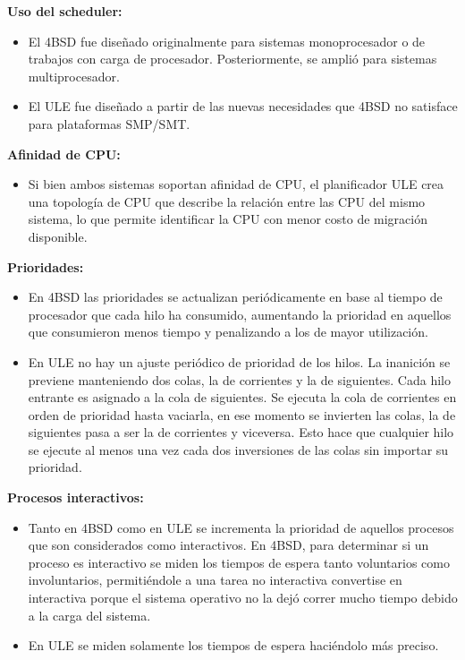 \documentclass[a4paper]{book}
\begin{document}
\textbf{Uso del scheduler:}

\begin{itemize}
\item El 4BSD fue diseñado originalmente para sistemas monoprocesador o de trabajos con carga de procesador. Posteriormente, se amplió para sistemas multiprocesador.
\item El ULE fue diseñado a partir de las nuevas necesidades que 4BSD no satisface para plataformas SMP/SMT.
\end{itemize}

\textbf{Afinidad de CPU:}

\begin{itemize}
\item Si bien ambos sistemas soportan afinidad de CPU, el planificador ULE crea una topología de CPU que describe la relación entre las CPU del mismo sistema, lo que permite identificar la CPU con menor costo de migración disponible.
\end{itemize}

\textbf{Prioridades:}

\begin{itemize}
\item En 4BSD las prioridades se actualizan peri\'odicamente en base al tiempo de procesador que cada hilo ha consumido, aumentando la prioridad en aquellos que consumieron menos tiempo y penalizando a los de mayor utilizaci\'on.
\item En ULE no hay un ajuste peri\'odico de prioridad de los hilos. La inanici\'on se previene manteniendo dos colas, la de corrientes y la de siguientes. Cada hilo entrante es asignado a la cola de siguientes. Se ejecuta la cola de corrientes en orden de prioridad hasta vaciarla, en ese momento se invierten las colas, la de siguientes pasa a ser la de corrientes y viceversa. Esto hace que cualquier hilo se ejecute al menos una vez cada dos inversiones de las colas sin importar su prioridad.
\end{itemize}

\textbf{Procesos interactivos:}

\begin{itemize}
\item Tanto en 4BSD como en ULE se incrementa la prioridad de aquellos procesos que son considerados como interactivos. En 4BSD, para determinar si un proceso es interactivo se miden los tiempos de espera tanto voluntarios como involuntarios, permitiéndole a una tarea no interactiva convertise en interactiva porque el sistema operativo no la dejó correr mucho tiempo debido a la carga del sistema.
\item En ULE se miden solamente los tiempos de espera haciéndolo más preciso.
\end{itemize}
\end{document}
